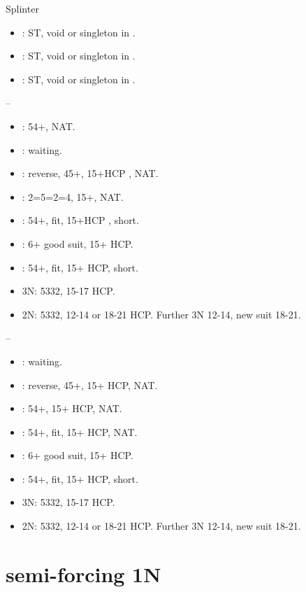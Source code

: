 \documentclass[12pt,twoside,a5paper]{report}%
\begin{document}
	Splinter
	\begin{itemize}
	\renewcommand{\labelitemi}{}
	\item {}: ST, void or singleton in \cl{}.
	\item {}: ST, void or singleton in \di{}.
	\item {}: ST, void or singleton in \sp{}.
	\end{itemize}

	--
	\begin{itemize}
	\renewcommand{\labelitemi}{}
	\item {}: 5\he{}4\di{}+, NAT.
	\item {}: waiting.
	\item {}: reverse, 4\sp{}5\he{}+, 15+HCP , NAT.
	\item {}: 2=5=2=4, 15+, NAT.
	\item {}: 5\he{}4\cl{}+, fit, 15+HCP , short\di{}.
	\item {}: 6\he{}+ good suit, 15+ HCP.
	\item {}: 5\he{}4\cl{}+, fit, 15+ HCP, short\sp{}.
	\item 3N: 5332, 15-17 HCP.
	\item 2N: 5332, 12-14 or 18-21 HCP. Further 3N 12-14, new suit 18-21.
	\end{itemize}

	--
	\begin{itemize}
	\renewcommand{\labelitemi}{}
	\item {}: waiting.
	\item {}: reverse, 45+, 15+ HCP, NAT.
	\item {}: 5\he{}4\cl{}+, 15+ HCP, NAT.
	\item {}: 5\he{}4\di{}+, fit, 15+ HCP, NAT.
	\item {}: 6\he{}+ good suit, 15+ HCP.
	\item {}: 5\he{}4\di{}+, fit, 15+ HCP, short\sp{}.
	\item 3N: 5332, 15-17 HCP.
	\item 2N: 5332, 12-14 or 18-21 HCP. Further 3N 12-14, new suit 18-21.
	\end{itemize}

	\section*{semi-forcing 1N}
\end{document}

